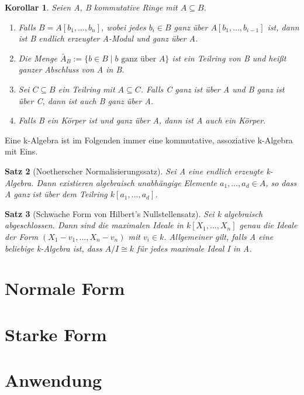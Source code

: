 \documentclass{article}
\newtheorem{satz}{Satz}
\newtheorem{korollar}[satz]{Korollar}
\begin{document}
	\begin{korollar}
	Seien A, B kommutative Ringe mit \(A \subseteq B\).
	\begin{enumerate}
	\item Falls \(B = A[b_1, \ldots, b_n]\), wobei jedes \(b_i \in B\) ganz über
	\(A[b_1, \ldots, b_{i-1}]\) ist, dann ist B endlich erzeugter A-Modul und 
	ganz über A.
	\item Die Menge \(\bar{A}_B := \{b \in B\;|\;b \text{ ganz über } A\}\) ist
	ein Teilring von B und heißt ganzer Abschluss von A in B.
	\item Sei \(C \subseteq B\) ein Teilring mit \(A \subseteq C\). Falls C
	ganz ist über A und B ganz ist über C, dann ist auch B ganz über A.
	\item Falls B ein Körper ist und ganz über A, dann ist A auch ein Körper.
	\end{enumerate}
	\end{korollar}

	Eine k-Algebra ist im Folgenden immer eine kommutative, assoziative
	k-Algebra mit Eins.

	\begin{satz}[Noetherscher Normalisierungssatz]
	Sei A eine endlich erzeugte k-Algebra. Dann existieren algebraisch
	unabhängige Elemente \(a_1, \ldots, a_d \in A\), so dass A ganz ist über
	dem Teilring \(k[a_1, \ldots, a_d]\).
	\end{satz}

	\begin{satz}[Schwache Form von Hilbert's Nullstellensatz]
	Sei k algebraisch abgeschlossen. Dann sind die maximalen Ideale in
	\(k[X_1, \ldots, X_n]\) genau die Ideale der Form \((X_1-v_1,\ldots,
	X_n-v_n)\) mit \(v_i \in k\). Allgemeiner gilt, falls A eine beliebige
	k-Algebra ist, dass \(A/I \cong k\) für jedes maximale Ideal I in A.
	\end{satz}


\section{Normale Form}
\section{Starke Form}
\section{Anwendung}
\end{document}
